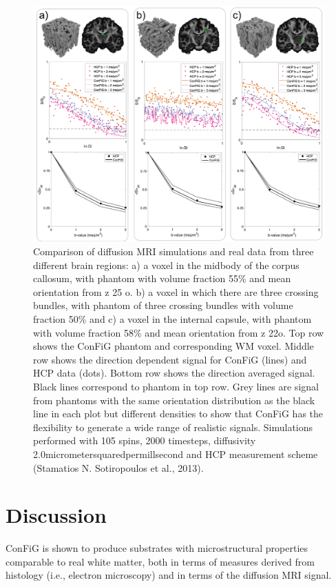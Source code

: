 \begin{figure}
  \centering
  \includegraphics[width=\textwidth]{figures/config/hcp_vs_sim_new_review_2_whitebg.png}
  \caption[dMRI signals from HCP subject and ConFiG phantoms ]{Comparison of diffusion MRI simulations and real data from three different brain regions:  a) a voxel  in the midbody of the corpus callosum, with phantom with volume fraction 55\% and mean orientation from z 25 o. b) a voxel  in which there are three crossing bundles, with phantom of three crossing bundles with volume fraction 50\% and c) a voxel in the internal capsule, with phantom with volume fraction 58\% and mean orientation from z 22o. Top row shows the ConFiG phantom and corresponding WM voxel. Middle row shows the direction dependent signal for ConFiG (lines) and HCP data (dots). Bottom row shows the direction averaged signal. Black lines correspond to phantom in top row. Grey lines are signal from phantoms with the same orientation distribution as the black line in each plot but different densities to show that ConFiG has the flexibility to generate a wide range of realistic signals. Simulations performed with 105 spins, 2000 timesteps, diffusivity 2.0micrometersquaredpermillsecond  and HCP measurement scheme (Stamatios N. Sotiropoulos et al., 2013). }
  \label{fig:config_res_dMRI}
\end{figure}

\section{Discussion}
\label{sec:config_discussion}
ConFiG is shown to produce substrates with microstructural properties comparable to real white matter, both in terms of measures derived from histology (i.e., electron microscopy) and in terms of the diffusion MRI signal.


